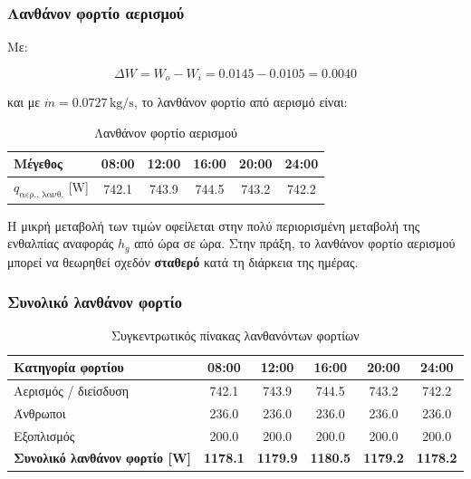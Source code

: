 \documentclass[12pt,a4paper]{article}
\begin{document}
\subsubsection{Λανθάνον φορτίο αερισμού}

Με:

\[
\Delta W = W_o - W_i = 0.0145 - 0.0105 = 0.0040
\]

και με \(\dot m = 0.0727\,\mathrm{kg/s}\), το λανθάνον φορτίο από αερισμό είναι:

\begin{table}[H]
\centering
\caption{Λανθάνον φορτίο αερισμού}
\begin{tabular}{lccccc}
\toprule
\textbf{Μέγεθος} & \textbf{08:00} & \textbf{12:00} & \textbf{16:00} & \textbf{20:00} & \textbf{24:00} \\
\midrule
\(q_{\text{αερ., λανθ.}}\) [W] & 742.1 & 743.9 & 744.5 & 743.2 & 742.2 \\
\bottomrule
\end{tabular}
\end{table}

Η μικρή μεταβολή των τιμών οφείλεται στην πολύ περιορισμένη μεταβολή της ενθαλπίας
αναφοράς \(h_g\) από ώρα σε ώρα. Στην πράξη, το λανθάνον φορτίο αερισμού μπορεί να
θεωρηθεί σχεδόν \textbf{σταθερό} κατά τη διάρκεια της ημέρας.

\subsubsection{Συνολικό λανθάνον φορτίο}

\begin{table}[H]
\centering
\caption{Συγκεντρωτικός πίνακας λανθανόντων φορτίων}
\begin{tabular}{lccccc}
\toprule
\textbf{Κατηγορία φορτίου} & \textbf{08:00} & \textbf{12:00} & \textbf{16:00} & \textbf{20:00} & \textbf{24:00} \\
\midrule
Αερισμός / διείσδυση & 742.1 & 743.9 & 744.5 & 743.2 & 742.2 \\
Άνθρωποι & 236.0 & 236.0 & 236.0 & 236.0 & 236.0 \\
Εξοπλισμός & 200.0 & 200.0 & 200.0 & 200.0 & 200.0 \\
\midrule
\textbf{Συνολικό λανθάνον φορτίο [W]} & \textbf{1178.1} & \textbf{1179.9} & \textbf{1180.5} & \textbf{1179.2} & \textbf{1178.2} \\
\bottomrule
\end{tabular}
\end{table}
\end{document}
